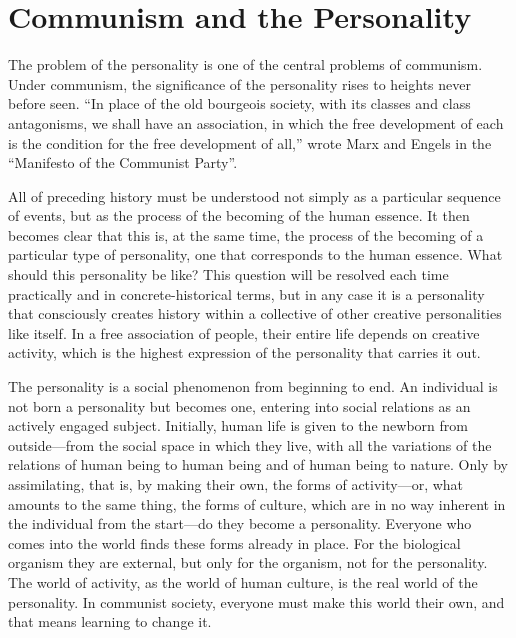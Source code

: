 \documentclass[../main]{subfiles}
\begin{document}
\ifSubfilesClassLoaded{\setcounter{page}{47}}{}
\section{Communism and the Personality}
\label{sec:08_communism_personality}

The problem of the personality is one of the central problems of communism. Under communism, the significance of the personality rises to heights never before seen. “In place of the old bourgeois society, with its classes and class antagonisms, we shall have an association, in which the free development of each is the condition for the free development of all,” wrote Marx and Engels in the “Manifesto of the Communist Party”.

All of preceding history must be understood not simply as a particular sequence of events, but as the process of the becoming of the human essence. It then becomes clear that this is, at the same time, the process of the becoming of a particular type of personality, one that corresponds to the human essence. What should this personality be like? This question will be resolved each time practically and in concrete-historical terms, but in any case it is a personality that consciously creates history within a collective of other creative personalities like itself. In a free association of people, their entire life depends on creative activity, which is the highest expression of the personality that carries it out.

The personality is a social phenomenon from beginning to end. An individual is not born a personality but becomes one, entering into social relations as an actively engaged subject. Initially, human life is given to the newborn from outside—from the social space in which they live, with all the variations of the relations of human being to human being and of human being to nature. Only by assimilating, that is, by making their own, the forms of activity—or, what amounts to the same thing, the forms of culture, which are in no way inherent in the individual from the start—do they become a personality. Everyone who comes into the world finds these forms already in place. For the biological organism they are external, but only for the organism, not for the personality. The world of activity, as the world of human culture, is the real world of the personality. In communist society, everyone must make this world their own, and that means learning to change it.
\end{document}
